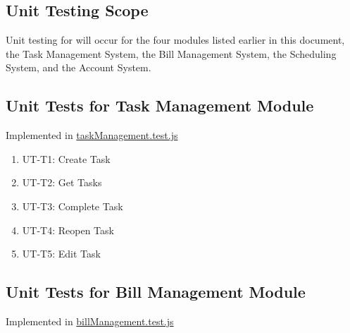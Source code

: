 \documentclass[12pt, titlepage]{article}
\begin{document}
\subsection{Unit Testing Scope}

Unit testing for \progname{} will occur  for the four modules listed earlier in this document, the Task Management System, the Bill Management System, the Scheduling System, and the Account System.


\subsection{Unit Tests for Task Management Module}

Implemented in \href{https://github.com/DangJustin/CapstoneProject/blob/main/src/rev0_demo/server/tests/taskManagement.test.js}{taskManagement.test.js}

\begin{enumerate}
    \item UT-T1: Create Task
    \item UT-T2: Get Tasks
    \item UT-T3: Complete Task
    \item UT-T4: Reopen Task
    \item UT-T5: Edit Task
\end{enumerate}

\subsection{Unit Tests for Bill Management Module}

Implemented in \href{https://github.com/DangJustin/CapstoneProject/blob/main/src/rev0_demo/server/tests/billManagement.test.js}{billManagement.test.js}
\end{document}
